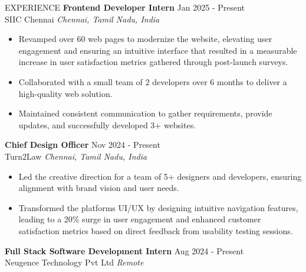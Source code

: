 \documentclass{resume} %
\begin{document}






\begin{rSection}{EXPERIENCE}
    \textbf{Frontend Developer Intern} \hfill Jan 2025 - Present\\
SIIC Chennai \hfill \textit{Chennai, Tamil Nadu, India}


\begin{itemize}
\itemsep -3pt{}
\item Revamped over 60 web pages to modernize the website, elevating user engagement and ensuring an intuitive interface that resulted in a measurable increase in user satisfaction metrics gathered through post-launch surveys.
\item Collaborated with a small team of 2 developers over 6 months to deliver a high-quality web solution.
\item Maintained consistent communication to gather requirements, provide updates, and successfully developed 3+ websites.
\end{itemize}
\textbf{Chief Design Officer} \hfill Nov 2024 - Present\\
Turn2Law \hfill \textit{Chennai, Tamil Nadu, India}


\begin{itemize}
\itemsep -3pt{}
\item Led the creative direction for a team of 5+ designers and developers, ensuring alignment with brand vision and user needs.
\item Transformed the platforms UI/UX by designing intuitive navigation features, leading to a 20\% surge in user engagement and enhanced customer satisfaction metrics based on direct feedback from usability testing sessions.
\end{itemize}
\textbf{Full Stack Software Development Intern} \hfill Aug 2024 - Present\\
Neugence Technology Pvt Ltd \hfill \textit{Remote}



\end{rSection}
\end{document}
